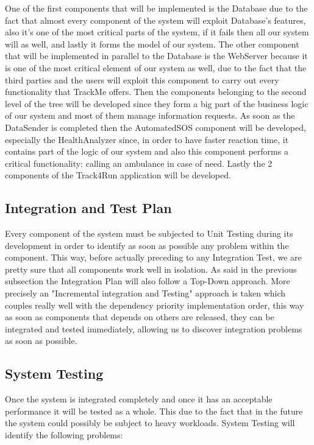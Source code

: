 \noindent
One of the first components that will be implemented is the Database due to the fact that almost every component of the system will exploit Database's features, also it's one of the most critical parts of the system, if it fails then all our system will as well, and lastly it forms the model of our system.
\medbreak
\noindent
The other component that will be implemented in parallel to the Database is the WebServer because it is one of the most critical element of our system as well, due to the fact that the third parties and the users will exploit this component to carry out every functionality that TrackMe offers.
\medbreak
\noindent
Then the components belonging to the second level of the tree will be developed since they form a big part of the business logic of our system and most of them manage information requests.
\medbreak
\noindent
As soon as the DataSender is completed then the AutomatedSOS component will be developed, especially the HealthAnalyzer since, in order to have faster reaction time, it contains part of the logic of our system and also this component performs a critical functionality: calling an ambulance in case of need.
\medbreak
\noindent
Lastly the 2 components of the Track4Run application will be developed.

\subsection{Integration and Test Plan}
Every component of the system must be subjected to Unit Testing during its development in order to identify as soon as possible any problem within the component. This way, before actually preceding to any Integration Test, we are pretty sure that all components work well in isolation.
\medbreak
\noindent
As said in the previous subsection the Integration Plan will also follow a Top-Down approach. More precisely an "Incremental integration and Testing" approach is taken which couples really well with the dependency priority implementation order, this way as soon as components that depends on others are released, they can be integrated and tested immediately, allowing us to discover integration problems as soon as possible.
\medbreak
\noindent


\subsection{System Testing}
Once the system is integrated completely and once it has an acceptable performance it will be tested as a whole. This due to the fact that in the future the system could possibly be subject to heavy workloads. System Testing will identify the following problems:

